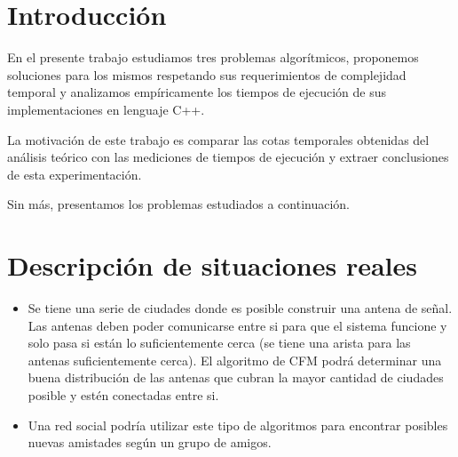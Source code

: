 \documentclass[a4paper, 10pt, twoside]{article}
\begin{document}
\newpage




\tableofcontents

\newpage




\section{Introducción}

En el presente trabajo estudiamos tres problemas algorítmicos, proponemos soluciones para los mismos respetando sus requerimientos de complejidad temporal y analizamos empíricamente los tiempos de ejecución de sus implementaciones en lenguaje C++.

La motivación de este trabajo es comparar las cotas temporales obtenidas del análisis teórico con las mediciones de tiempos de ejecución y extraer conclusiones de esta experimentación.

Sin más, presentamos los problemas estudiados a continuación.




\newpage

\section{Descripción de situaciones reales}
\begin{itemize}
\item Se tiene una serie de ciudades donde es posible construir una antena de señal. Las antenas deben poder comunicarse entre si para que el sistema funcione y solo pasa si están lo suficientemente cerca (se tiene una arista para las antenas suficientemente cerca). El algoritmo de CFM podrá determinar una buena distribución de las antenas que cubran la mayor cantidad de ciudades posible y estén conectadas entre si.

\item Una red social podría utilizar este tipo de algoritmos para encontrar posibles nuevas amistades según un grupo de amigos.
\end{itemize}
\end{document}

